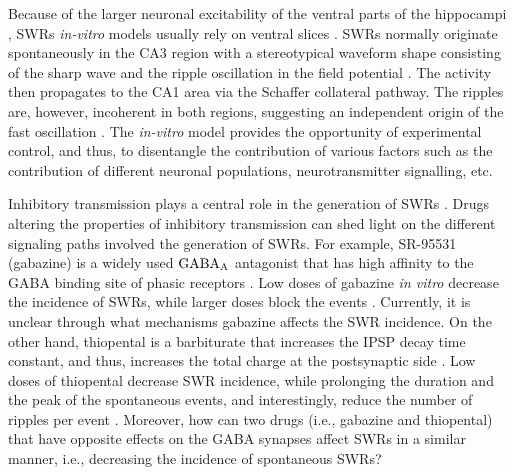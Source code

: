     Because of the larger neuronal excitability of the ventral parts of the
    hippocampi \citep{Dougherty2012}, SWRs \textit{in-vitro} models usually
    rely on ventral slices \citep[e.g.,][]{Maier2003, Nimmrich2005}. SWRs
    normally originate spontaneously in the CA3 region with a stereotypical
    waveform shape consisting of the sharp wave and the ripple oscillation in
    the field potential \citep{Csicsvari1999}. The activity then propagates to
    the CA1 area via the Schaffer collateral pathway. The ripples are, however,
    incoherent in both regions, suggesting an independent origin of the fast
    oscillation \citep{Csicsvari2000, Both2008}. The \textit{in-vitro} model
    provides the opportunity of experimental control, and thus, to disentangle
    the contribution of various factors such as the contribution of different
    neuronal populations, neurotransmitter signalling, etc.
    
    Inhibitory transmission plays a central role in the generation of SWRs
    \citep{Maier2003, Schlingloff2014}. Drugs altering the properties of
    inhibitory transmission can shed light on the different signaling paths
    involved the generation of SWRs. For example, SR-95531 (gabazine) is a
    widely used $\rm GABA_A$ antagonist that has high affinity to the GABA
    binding site of phasic receptors \citep{Ueno1997, Bai2001, Yeung2003}.  Low
    doses of gabazine \textit{in vitro} decrease the incidence of SWRs, while
    larger doses block the events \citep{Maier2003, Nimmrich2005,
    Ellender2010}. Currently, it is unclear through what mechanisms gabazine
    affects the SWR incidence.
    On the other hand, thiopental is a barbiturate that increases the IPSP
    decay time constant, and thus, increases the total charge at the
    postsynaptic side \citep{Dickinson2002}.
    Low doses of thiopental decrease SWR incidence, while prolonging the
    duration and the peak of the spontaneous events, and interestingly, reduce
    the number of ripples per event \citep{Papatheodoropoulos2007}. Moreover,
    how can two drugs (i.e., gabazine and thiopental) that have opposite
    effects on the GABA synapses affect SWRs in a similar manner, i.e.,
    decreasing the incidence of spontaneous SWRs?

